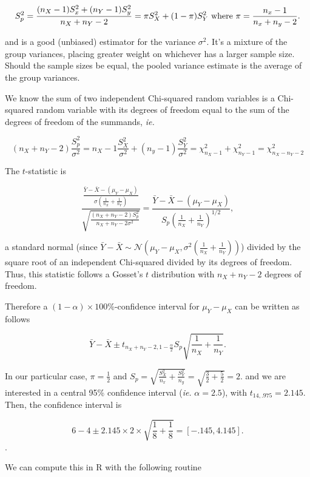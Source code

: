 \documentclass{homework}
\begin{document}
$$
S_p^2 = \frac{(n_X-1)S_x^2 + (n_Y-1)S_y^2 }{n_X+n_Y-2} = \pi S_X^2 + (1-\pi) S_Y^2 \textnormal{  where } \pi = \frac{n_x-1}{n_x+n_y-2}.
$$

and is a good (unbiased) estimator for the variance $\sigma^2$. It's a mixture of the group variances, placing greater weight on whichever has a larger sample size. Should the sample sizes be equal, the pooled variance estimate is the average of the group variances. 

We know the sum of two independent Chi-squared random variables is a Chi-squared random variable with its degrees of freedom equal to the sum of the degrees of freedom of the summands, \textit{ie.} 

\begin{dmath*}
(n_X+n_Y-2)\frac{S_p^2}{\sigma^2} = {n_X-1} \frac{S_X^2}{\sigma^2} +  (n_y-1) \frac{S_Y^2}{\sigma^2} =\chi^2_{n_X-1}+\chi^2_{n_Y-1} = \chi^2_{n_X-n_Y-2}
\end{dmath*}

The $t$-statistic is 

$$
\frac{\frac{\bar{Y}-\bar{X} - (\mu_Y-\mu_X) }{\sigma\left(\frac{1}{n_X}+\frac{1}{n_Y}\right)}}{\sqrt{\frac{(n_X+n_Y-2)S_p^2}{n_X+n_Y-2\sigma^2}}} = \frac{\bar{Y}-\bar{X}- (\mu_Y-\mu_X)}{S_p \left(\frac{1}{n_X}+\frac{1}{n_Y}\right)^{1/2}},
$$

a standard normal (since $\bar{Y}-\bar{X} \sim \mathcal{N}\left(\mu_{Y}-\mu_{X},\sigma^2 \left(\frac{1}{n_X}+\frac{1}{n_Y}\right)\right)$) divided by  the square root of an independent Chi-squared divided by its degrees of freedom. Thus, this statistic follows a Gosset's $t$ distribution with $n_X+n_Y-2$ degrees of freedom.

Therefore a $(1-\alpha)\times 100\%$-confidence interval for $\mu_Y-\mu_X$ can be written as follows

$$
\bar{Y}-\bar{X}\pm t_{n_{X}+n_{Y}-2,1-\frac{\alpha}{2}}S_p \sqrt{\frac{1}{n_X}+\frac{1}{n_Y}}.
$$

In our particular case, $\pi = \frac{1}{2}$ and $S_p = \sqrt{\frac{S_X^2}{n_x}+\frac{S_Y^2}{n_y}} = \sqrt{\frac{3}{2}+\frac{5}{2}} = 2.$ and
we are interested in a central 95\% confidence interval (\textit{ie.} $\alpha=2.5$), with $t_{14,.975} = 2.145$. Then, the confidence interval is 

$$
6-4 \pm 2.145 \times 2 \times \sqrt{\frac{1}{8}+\frac{1}{8}} = [-.145,4.145].
$$.

We can compute this in R with the following routine
\end{document}
